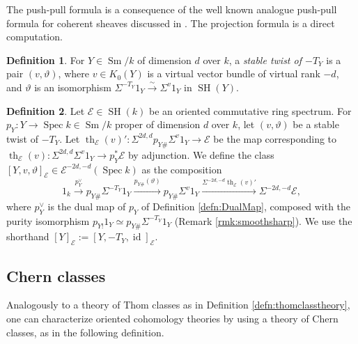 \documentclass[10pt]{amsart}
\theoremstyle{definition}
\newtheorem{defn}{Definition}[section]
\theoremstyle{plain}
\numberwithin{equation}{section}
\newcommand{\0}{\emptyset}
\newcommand{\sE}{{\mathcal E}}
\newcommand{\Spec}{{\operatorname{Spec}}}
\newcommand{\SH}{{\operatorname{SH}}}
\newcommand{\Sm}{{\operatorname{Sm}}}
\renewcommand{\th}{{\operatorname{th}}}
\newcommand{\id}{{\operatorname{id}}}
\begin{document}
The push-pull formula is a consequence of the well known analogue push-pull formula for coherent sheaves discussed in \cite[Section 9]{EGA1}. The projection formula is a direct computation.
 
\begin{defn}\label{defn:stwist} For $Y\in \Sm/k$ of dimension $d$ over $k$, a {\em stable  twist of $-T_Y$} is a pair  $(v, \vartheta)$, where $v\in K_0(Y)$ is a virtual vector bundle of virtual rank $-d$, and $\vartheta$ is an isomorphism $\Sigma^{-T_Y}1_Y\xrightarrow{\sim} \Sigma^v1_Y$ in $\SH(Y)$.  
\end{defn}

\begin{defn}\label{defn:twistclass} Let $\sE\in \SH(k)$ be an oriented commutative ring spectrum. For $p_Y:Y\to \Spec k\in \Sm/k$ proper of dimension $d$ over $k$, let $(v, \vartheta)$ be a stable twist of $-T_Y$. Let $\th_\sE(v)':\Sigma^{2d,d}p_{Y\#}\Sigma^{v}1_Y\to
\sE$ be the map corresponding to $\th_\sE(v):\Sigma^{2d,d}\Sigma^v1_Y\to p_Y^*\sE$ by adjunction. We define the class $[Y, v,\vartheta]_\sE\in \sE^{-2d,-d}(\Spec k)$ as the composition
\[
1_k\xrightarrow{p_Y^\vee}p_{Y\#}\Sigma^{-T_Y}1_Y\xrightarrow{p_{Y\#}(\vartheta)}
p_{Y\#}\Sigma^{v}1_Y\xrightarrow{\Sigma^{-2d,-d}\th_\sE(v)'}\Sigma^{-2d,-d}\sE,
\]
where $p_Y^\vee$ is the dual map of $p_Y$ of Definition \ref{defn:DualMap}, composed with the purity isomorphism $p_{Y!}1_Y\simeq p_{Y\#}\Sigma^{-T_Y}1_Y$ (Remark \ref{rmk:smoothsharp}). We use the shorthand $[Y]_\sE :=[Y,-T_Y, \id]_\sE$.
\end{defn}

\subsection{Chern classes}
\label{section:Chern}

Analogously to a theory of Thom classes as in Definition \ref{defn:thomclasstheory}, one can characterize oriented cohomology theories by using a theory of Chern classes, as in the following definition.
\end{document}

